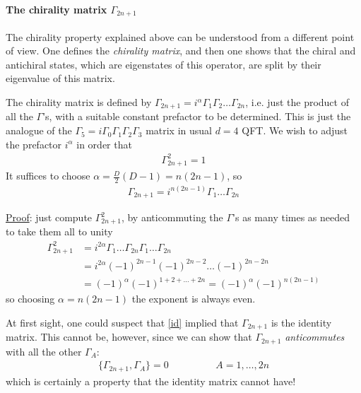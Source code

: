 \documentclass[a4paper,12pt]{article}
\numberwithin{equation}{section}
\numberwithin{exe}{section}
\newcommand{\G}{{\Gamma}}
\begin{document}
\paragraph{The chirality matrix $\G_{2n+1}$} The chirality property explained above can be understood from a different point of view. One defines the \textit{chirality matrix}, and then one shows that the chiral and antichiral states, which are eigenstates of this operator, are split by their eigenvalue of this matrix. 

The chirality matrix is defined by $\G_{2n+1}=i^\alpha \G_1 \G_2\hdots \G_{2n}$, i.e. just the product of all the $\G$'s, with a suitable constant prefactor to be determined. This is just the analogue of the $\G_5=i\G_0\G_1\G_2\G_3$ matrix in usual $d=4$ QFT. We wish to adjust the prefactor $i^\alpha$ in order that 
	\begin{align}\label{id}
	\G_{2n+1}^2=1
	\end{align}
It suffices to choose $\alpha=\frac{D}{2}\left( D-1 \right)=n(2n-1)$, so
	\begin{align}\label{g2n+1}
	\boxed{ \G_{2n+1}=i^{n(2n-1)} \G_1\hdots \G_{2n} } 
	\end{align}

\underline{Proof}: just compute $\G_{2n+1}^2$, by anticommuting the $\G$'s as many times as needed to take them all to unity
	\begin{align*}\label{}
	\G_{2n+1}^2&=i^{2\alpha} \G_1\hdots \G_{2n} \G_1\hdots \G_{2n}\\
	&=i^{2\alpha} (-1)^{2n-1}(-1)^{2n-2}\hdots(-1)^{2n-2n}\\
	&=(-1)^{\alpha} (-1)^{1+2+\hdots +2n} = (-1)^\alpha (-1)^{n(2n-1)}
	\end{align*}
so choosing $\alpha=n(2n-1)$ the exponent is always even.

At first sight, one could suspect that \eqref{id} implied that $\G_{2n+1}$ is the identity matrix. This cannot be, however, since we can show that $\G_{2n+1}$ \textit{anticommutes} with all the other $\G_A$:
	\begin{align}\label{anticomm}
	\{ \G_{2n+1} , \G_A \}=0\hspace{2cm}A=1,\hdots,2n
	\end{align}
which is certainly a property that the identity matrix cannot have!
\end{document}
